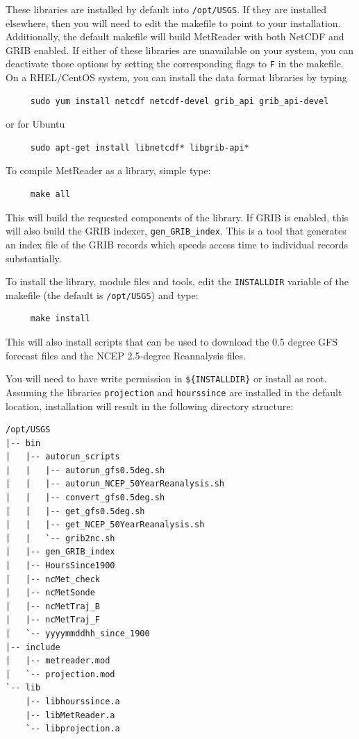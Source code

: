 \documentclass[11pt]{article}   %
\begin{document}
These libraries are installed by default into \texttt{/opt/USGS}.  If they are
installed elsewhere, then you will need to edit the makefile to point to your
installation.
Additionally, the default makefile will build MetReader with both NetCDF and GRIB
enabled.  If either of these libraries are unavailable on your system, you can
deactivate those options by setting the corresponding flags to \texttt{F} in the makefile.
On a RHEL/CentOS system, you can install the data format libraries by typing
\begin{verbatim}
     sudo yum install netcdf netcdf-devel grib_api grib_api-devel
\end{verbatim}
or for Ubuntu
\begin{verbatim}
     sudo apt-get install libnetcdf* libgrib-api*
\end{verbatim}
To compile MetReader as a library, simple type:
\begin{verbatim}
     make all
\end{verbatim}
This will build the requested components of the library.  If GRIB is enabled,
this will also build the GRIB indexer, \texttt{gen\_GRIB\_index}.
This is a tool that generates an index file of the GRIB records which speeds
access time to individual records substantially.

To install the library, module files and tools, edit the \texttt{INSTALLDIR} variable of
the makefile (the default is \texttt{/opt/USGS}) and type:
\begin{verbatim}
     make install
\end{verbatim}
This will also install scripts that can be used to download the 0.5 degree GFS
forecast files and the NCEP 2.5-degree Reannalysis files.

You will need to have write permission in \texttt{\$\{INSTALLDIR\}}
or install as root.  Assuming the libraries \texttt{projection} and \texttt{hourssince} are
installed in the default location, installation will result in the following
directory structure:
\begin{verbatim}
/opt/USGS
|-- bin
|   |-- autorun_scripts
|   |   |-- autorun_gfs0.5deg.sh
|   |   |-- autorun_NCEP_50YearReanalysis.sh
|   |   |-- convert_gfs0.5deg.sh
|   |   |-- get_gfs0.5deg.sh
|   |   |-- get_NCEP_50YearReanalysis.sh
|   |   `-- grib2nc.sh
|   |-- gen_GRIB_index
|   |-- HoursSince1900
|   |-- ncMet_check
|   |-- ncMetSonde
|   |-- ncMetTraj_B
|   |-- ncMetTraj_F
|   `-- yyyymmddhh_since_1900
|-- include
|   |-- metreader.mod
|   `-- projection.mod
`-- lib
    |-- libhourssince.a
    |-- libMetReader.a
    `-- libprojection.a
\end{verbatim}
\end{document}
